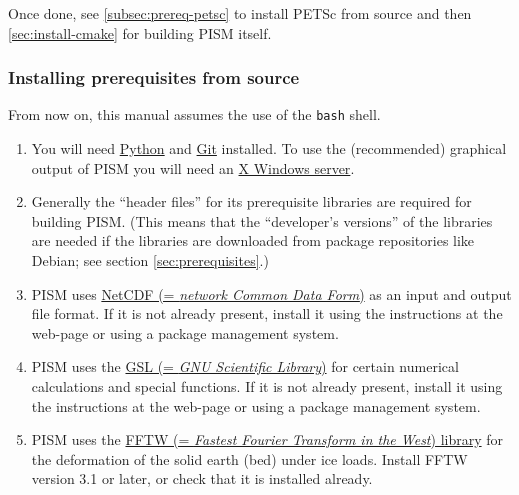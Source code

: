 \documentclass[titlepage,letterpaper,final]{scrartcl}
\begin{document}
Once done, see \ref{subsec:prereq-petsc} to install PETSc from source and then
\ref{sec:install-cmake} for building PISM itself.

\vspace{0.3in}


\subsubsection{Installing prerequisites from source}
\label{subsec:prereq-source}
\renewcommand{\labelenumi}{\textbf{\arabic{enumi}.}~}

From now on, this manual assumes the use of the \texttt{bash} shell.
\medskip

\begin{enumerate}
\item  You will need
  \href{http://www.python.org/}{Python} and \href{http://git-scm.com/}{Git}
  installed. To use
  the (recommended) graphical output of PISM you will need an
  \href{http://www.x.org/}{X Windows server}.

\item Generally the ``header files'' for its prerequisite libraries
  are required for building PISM.  (This means that the
  ``developer's versions'' of the libraries are needed if the libraries are
  downloaded from package repositories like Debian; see section \ref{sec:prerequisites}.)

\item PISM uses \href{http://www.unidata.ucar.edu/software/netcdf/}{NetCDF (=
  \emph{network Common Data Form})} as an input and output
  file format. If it is not already present, install it using the instructions
  at the web-page or using a package management system.

\item PISM uses the \href{http://www.gnu.org/software/gsl/}{GSL (= \emph{GNU
      Scientific Library})} for
  certain numerical calculations and special functions. If it is not already
  present, install it using the instructions at the web-page or using a package
  management system.

\item PISM uses the \href{http://www.fftw.org/}{FFTW
 (= \emph{Fastest Fourier Transform in the West}) library} for the
  deformation of the solid earth (bed) under ice loads.  Install FFTW version
  3.1 or later, or check that it is installed already.


\end{enumerate}
\end{document}
